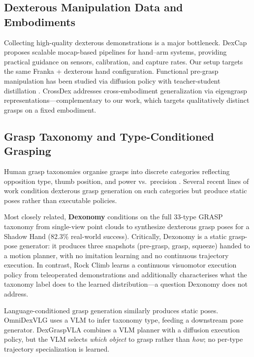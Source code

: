 \documentclass[11pt]{article}
\begin{document}
\subsection{Dexterous Manipulation Data and Embodiments}
Collecting high-quality dexterous demonstrations is a major bottleneck. DexCap
\citep{wang2024dexcap} proposes scalable mocap-based pipelines for hand--arm systems,
providing practical guidance on sensors, calibration, and capture rates. Our setup
targets the same Franka + dexterous hand configuration. Functional pre-grasp
manipulation has been studied via diffusion policy with teacher-student distillation
\citep{wu2024unidexfpm}. CrossDex \citep{crossdex2025} addresses cross-embodiment
generalization via eigengrasp representations---complementary to our work, which targets
qualitatively distinct grasps on a fixed embodiment.

\subsection{Grasp Taxonomy and Type-Conditioned Grasping}
Human grasp taxonomies organise grasps into discrete categories reflecting opposition
type, thumb position, and power vs.\ precision \citep{feix2016grasp}. Several recent
lines of work condition dexterous grasp generation on such categories but produce static
poses rather than executable policies.

Most closely related, \textbf{Dexonomy} \citep{dexonomy2025} conditions on the full
33-type GRASP taxonomy from single-view point clouds to synthesize dexterous grasp
poses for a Shadow Hand (82.3\% real-world success). Critically, Dexonomy is a static
grasp-pose generator: it produces three snapshots (pre-grasp, grasp, squeeze) handed to
a motion planner, with no imitation learning and no continuous trajectory execution. In
contrast, Rock Climb learns a continuous visuomotor execution policy from teleoperated
demonstrations and additionally characterises what the taxonomy label does to the
learned distribution---a question Dexonomy does not address.

Language-conditioned grasp generation \citep{tian2024graspasyousay} similarly produces
static poses. OmniDexVLG \citep{omnidexvlg2024} uses a VLM to infer taxonomy type,
feeding a downstream pose generator. DexGraspVLA \citep{dexgraspvla2026} combines a VLM
planner with a diffusion execution policy, but the VLM selects \emph{which object} to
grasp rather than \emph{how}; no per-type trajectory specialization is learned.
\end{document}
